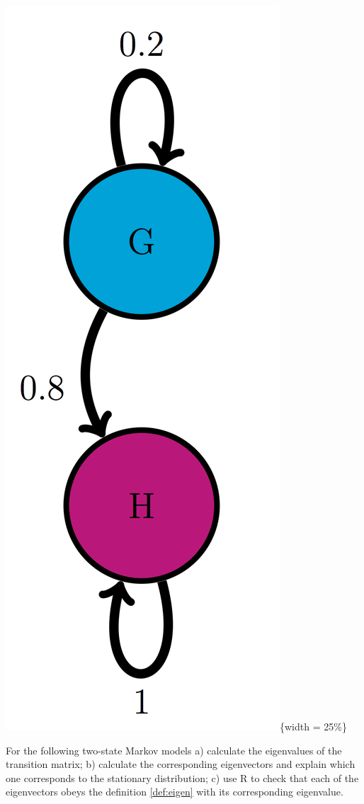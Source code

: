 \documentclass[
]{book}
\theoremstyle{definition}
\theoremstyle{definition}
\theoremstyle{definition}
\theoremstyle{remark}
\begin{document}
\includegraphics{ch10/GH_trans_diag.png}\{width = 25\%\}

For the following two-state Markov models a) calculate the eigenvalues of the transition matrix; b) calculate the corresponding eigenvectors and explain which one corresponds to the stationary distribution; c) use R to check that each of the eigenvectors obeys the definition \ref{def:eigen} with its corresponding eigenvalue.
\end{document}

